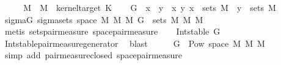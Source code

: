 \begin{isabellebody}
{}%
%
\isadelimproof
%
\endisadelimproof
%
\isatagproof
{}\isamarkupfalse%
\ {\isacharminus}{\kern0pt}\isanewline
\ \ \isamarkupfalse%
\ M{}\ \ {\isachardoublequoteopen}M{}\ {\isasymequiv}\ kernel{\isacharunderscore}{\kern0pt}target\ K{\isachardoublequoteclose}\isanewline
\ \ \isamarkupfalse%
\ {\isacharquery}{\kern0pt}G\ {\isacharequal}{\kern0pt}\ {\isachardoublequoteopen}{\isacharbraceleft}{\kern0pt}x\ {\isasymtimes}\ y\ {\isacharbar}{\kern0pt}\ x\ y{\isachardot}{\kern0pt}\ x\ {\isasymin}\ sets\ M{}\ {\isasymand}\ y\ {\isasymin}\ sets\ M{}{\isacharbraceright}{\kern0pt}{\isachardoublequoteclose}\isanewline
\ \ \isamarkupfalse%
\ sigma{\isacharunderscore}{\kern0pt}G{\isacharcolon}{\kern0pt}\ {\isachardoublequoteopen}sigma{\isacharunderscore}{\kern0pt}sets\ {\isacharparenleft}{\kern0pt}space\ {\isacharparenleft}{\kern0pt}M{}\ {\isasymOtimes}\isactrlsub M\ M{}{\isacharparenright}{\kern0pt}{\isacharparenright}{\kern0pt}\ {\isacharquery}{\kern0pt}G\ {\isacharequal}{\kern0pt}\ sets\ {\isacharparenleft}{\kern0pt}M{}\ {\isasymOtimes}\isactrlsub M\ M{}{\isacharparenright}{\kern0pt}{\isachardoublequoteclose}\isanewline
\ \ \ \ \isamarkupfalse%
\ {\isacharparenleft}{\kern0pt}metis\ sets{\isacharunderscore}{\kern0pt}pair{\isacharunderscore}{\kern0pt}measure\ space{\isacharunderscore}{\kern0pt}pair{\isacharunderscore}{\kern0pt}measure{\isacharparenright}{\kern0pt}\isanewline
\ \ \isamarkupfalse%
\ {\isachardoublequoteopen}Int{\isacharunderscore}{\kern0pt}stable\ {\isacharquery}{\kern0pt}G{\isachardoublequoteclose}\isanewline
\ \ \ \ \isamarkupfalse%
\ Int{\isacharunderscore}{\kern0pt}stable{\isacharunderscore}{\kern0pt}pair{\isacharunderscore}{\kern0pt}measure{\isacharunderscore}{\kern0pt}generator\ \isamarkupfalse%
\ blast\isanewline
\ \ \isamarkupfalse%
\ \isamarkupfalse%
\ {\isachardoublequoteopen}{\isacharquery}{\kern0pt}G\ {\isasymsubseteq}\ Pow\ {\isacharparenleft}{\kern0pt}space\ {\isacharparenleft}{\kern0pt}M{}\ {\isasymOtimes}\isactrlsub M\ M{}{\isacharparenright}{\kern0pt}{\isacharparenright}{\kern0pt}{\isachardoublequoteclose}\isanewline
\ \ \ \ \isamarkupfalse%
\ {\isacharparenleft}{\kern0pt}simp\ add{\isacharcolon}{\kern0pt}\ pair{\isacharunderscore}{\kern0pt}measure{\isacharunderscore}{\kern0pt}closed\ space{\isacharunderscore}{\kern0pt}pair{\isacharunderscore}{\kern0pt}measure{\isacharparenright}{\kern0pt}\isanewline

\end{isabellebody}

